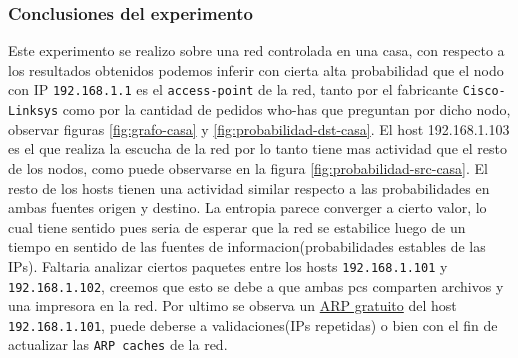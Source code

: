 \subsubsection{Conclusiones del experimento}
Este experimento se realizo sobre una red controlada en una casa, con respecto a los resultados obtenidos podemos inferir con cierta alta probabilidad que el nodo con IP \texttt{192.168.1.1} es el \texttt{access-point} de la red, tanto por el fabricante \texttt{Cisco-Linksys} como por la cantidad de pedidos who-has que preguntan por dicho nodo, observar figuras \ref{fig:grafo-casa} y \ref{fig:probabilidad-dst-casa}. El host 192.168.1.103 es el que realiza la escucha de la red por lo tanto tiene mas actividad que el resto de los nodos, como puede observarse en la figura \ref{fig:probabilidad-src-casa}. El resto de los hosts tienen una actividad similar respecto a las probabilidades en ambas fuentes origen y destino. La entropia parece converger a cierto valor, lo cual tiene sentido pues seria de esperar que la red se estabilice luego de un tiempo en sentido de las fuentes de informacion(probabilidades estables de las IPs). Faltaria analizar ciertos paquetes entre los hosts \texttt{192.168.1.101} y \texttt{192.168.1.102}, creemos que esto se debe a que ambas pcs comparten archivos y una impresora en la red. Por ultimo se observa un \href{http://wiki.wireshark.org/Gratuitous_ARP}{ARP gratuito} del host \texttt{192.168.1.101}, puede deberse a validaciones(IPs repetidas) o bien con el fin de actualizar las \texttt{ARP caches} de la red.